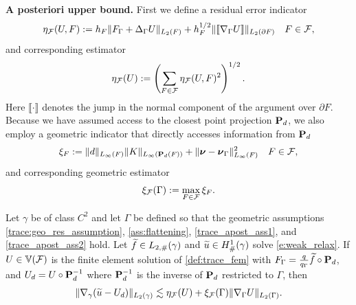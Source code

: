 \medskip\noindent
{\bf A posteriori upper bound.} 
First we define a residual error indicator
%
$$
\eta_{\mathcal{F}}(U,F) := h_F\|F_\Gamma+\Delta_\Gamma U\|_{L_2(F)} + h_F^{1/2}\|\llbracket \nabla_\Gamma U \rrbracket \|_{L_2(\partial F)} \quad F \in \mathcal{F},
$$
%
and corresponding estimator
%
\[
\eta_{\mathcal{F}} (U) := \left(\sum_{F\in\mathcal{F}} \eta_{\mathcal{F}}(U,F)^2 \right)^{1/2}.
\]
%
Here $\llbracket \cdot \rrbracket$ denotes the jump in the normal component of the argument over $\partial F$.  Because we have assumed access to the closest point projection ${\bf P}_d$, we also employ a geometric indicator that directly accesses information from ${\bf P}_d$
%
\begin{align*}
  \xi_F := \|d\|_{L_\infty(F)} \|K\|_{L_\infty({\bf P}_d(F))} + \|{\boldsymbol \nu}-{\boldsymbol \nu}_\Gamma\|_{L_\infty(F)}^2
  \quad F\in\mathcal{F},
\end{align*}
%
and corresponding geometric estimator
%
\[
\xi_{\mathcal{F}}(\Gamma) :=\max_{F \in \mathcal{F}} \xi_F.
\]
%
\begin{theorem}
Let $\gamma$ be of class $C^2$ and let $\Gamma$ be defined so that the geometric assumptions \eqref{trace:geo_res_assumption}, \eqref{ass:flattening}, \eqref{trace_apost_ass1}, and \eqref{trace_apost_ass2} hold. Let $\widetilde{f}\in L_{2,\#}(\gamma)$ and $\widetilde{u}\in H^1_\#(\gamma)$ solve \eqref{e:weak_relax}. If $U \in \mathbb{V}(\mathcal F)$ is the finite element solution of \eqref{def:trace_fem} with $F_\Gamma =\frac{q}{q_\Gamma} \widetilde{f} \circ {\bf P}_d $, and $U_d=U\circ{\bf P}_d^{-1}$ where ${\bf P}_d^{-1}$ is the inverse of ${\bf P}_d$ restricted to $\Gamma$, then
%
\begin{align}
\label{trace_apost}
\|\nabla_\gamma(\widetilde{u}-U_d)\|_{L_2(\gamma)} \lesssim \eta_{\mathcal{F}}(U) + \xi_{\mathcal{F}}(\Gamma) \|\nabla_\Gamma U\|_{L_2(\Gamma)}.
\end{align}
\end{theorem}

